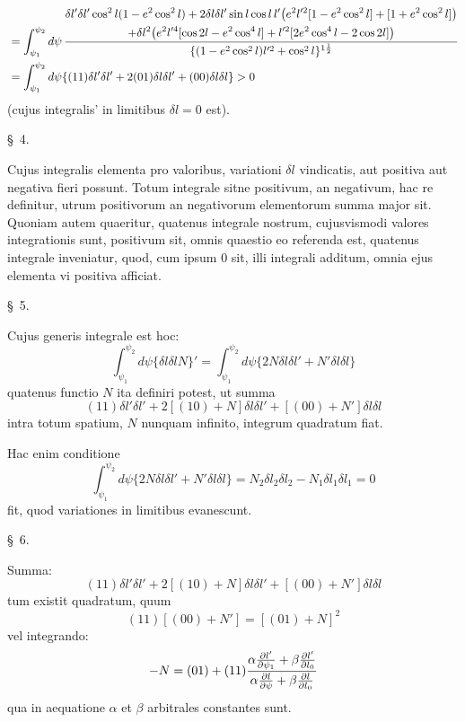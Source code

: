 \[
\begin{aligned}
&=\int_{\psi_1}^{\psi_2}d\psi\,
{\begin{gathered}
\delta l'\delta l'\cos^2l(1-e^2\cos^2l)
+2\delta l\delta l'\sin l\cos l\,l'\bigl(e^2l'^2[1-e^2\cos^2l]+[1+e^2\cos^2l]\bigr)\\
+\delta l^2\bigl(e^2l'^4[\cos2l-e^2\cos^4l]+l'^2[2e^2\cos^4l-2\cos2l]\bigr)
\end{gathered}
\over \{(1-e^2\cos^2l)l'^2+\cos^2l\}^{1\frac12}}\\
&=\int_{\psi_1}^{\psi_2}d\psi\{(11)\delta l'\delta l'+2(01)\delta l\delta l'+(00)\delta l\delta l\}>0
\end{aligned}
\]
(cujus integralis' in limitibus $\delta l=0$ est).

\begin{center}\S\ 4.\end{center}

Cujus integralis elementa pro valoribus, variationi $\delta l$ vindicatis, aut positiva aut negativa fieri possunt. Totum integrale sitne positivum, an negativum, hac re definitur, utrum positivorum an negativorum elementorum summa major sit. Quoniam autem quaeritur, quatenus integrale nostrum, cujusvismodi valores integrationis sunt, positivum sit, omnis quaestio eo referenda est, quatenus integrale inveniatur, quod, cum ipsum $0$ sit, illi integrali additum, omnia ejus elementa vi positiva afficiat.

\begin{center}\S\ 5.\end{center}

Cujus generis integrale est hoc:
\[
 \int_{\psi_1}^{\psi_2}d\psi\{\delta l\delta l N\}'=
 \int_{\psi_1}^{\psi_2}d\psi\{2N\delta l\delta l'+N'\delta l\delta l\}
\]
quatenus functio $N$ ita definiri potest, ut summa
\[
 (11)\delta l'\delta l'+2[(10)+N]\delta l\delta l'+[(00)+N']\delta l\delta l
\]
intra totum spatium, $N$ nunquam infinito, integrum quadratum fiat.

Hac enim conditione
\[
 \int_{\psi_1}^{\psi_2}d\psi\{2N\delta l\delta l'+N'\delta l\delta l\}=N_2\delta l_2\delta l_2-N_1\delta l_1\delta l_1=0
\]
fit, quod variationes in limitibus evanescunt.

\begin{center}\S\ 6.\end{center}

Summa:
\[
 (11)\delta l'\delta l'+2[(10)+N]\delta l\delta l'+[(00)+N']\delta l\delta l
\]
tum existit quadratum, quum
\[
 (11)[(00)+N']=[(01)+N]^2
\]
vel integrando:
\[
 -N=(01)+(11){\alpha {\partial l'\over\partial\psi_1}+\beta {\partial l'\over\partial l_0}
 \over \alpha {\partial l\over\partial\psi}+\beta {\partial l\over\partial l_0}}
\]
qua in aequatione $\alpha$ et $\beta$ arbitrales constantes sunt.



